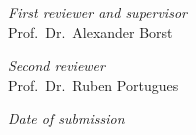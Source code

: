 

%
%
%
%


\hfill

\vfill

\textit{First reviewer and supervisor} \\
Prof.\ Dr.\ Alexander Borst

\bigskip

\textit{Second reviewer} \\
Prof.\ Dr.\ Ruben Portugues

\bigskip

\textit{Date of submission} \\
\myTime

\bigskip



